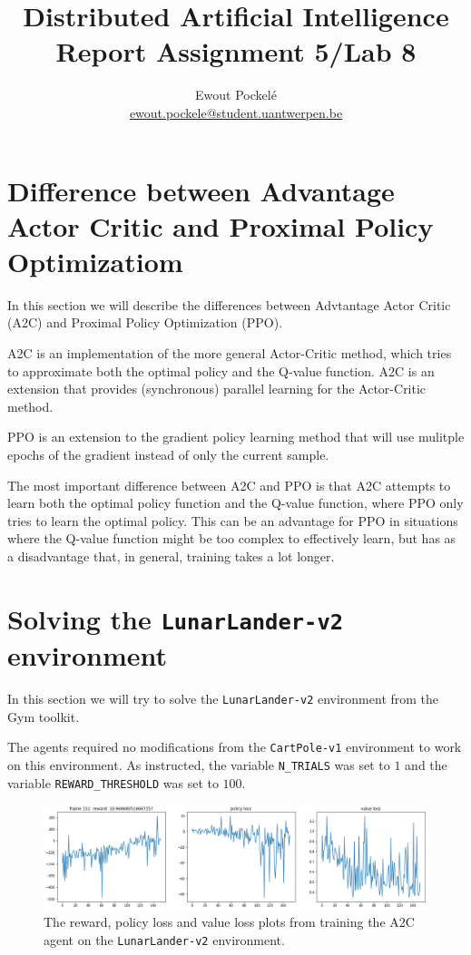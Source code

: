 \documentclass{article}
\title{Distributed Artificial Intelligence \\ \large{Report Assignment 5/Lab 8}}
\author{Ewout Pockelé \\ \href{mailto:ewout.pockele@student.uantwerpen.be}{ewout.pockele@student.uantwerpen.be}}
\begin{document}
 \maketitle

 \tableofcontents

 \section[Difference between A2C and PPO]{Difference between Advantage Actor 
   Critic and Proximal Policy Optimizatiom}
  In this section we will describe the differences between Advtantage Actor 
  Critic (A2C) and Proximal Policy Optimization (PPO).

  A2C is an implementation of the more general Actor-Critic method, which tries
  to approximate both the optimal policy and the Q-value function.  A2C is an
  extension that provides (synchronous) parallel learning for the Actor-Critic
  method. \cite[p.~62]{mets-policy-gradient}

  PPO is an extension to the gradient policy learning method that will use
  mulitple epochs of the gradient instead of only the current sample.
  \cite[p.~64]{mets-policy-gradient}

  The most important difference between A2C and PPO is that A2C attempts to
  learn both the optimal policy function and the Q-value function, where PPO
  only tries to learn the optimal policy.  This can be an advantage for PPO in
  situations where the Q-value function might be too complex to effectively
  learn, but has as a disadvantage that, in general, training takes a lot
  longer.

 \section{Solving the \texttt{LunarLander-v2} environment}
  In this section we will try to solve the \texttt{LunarLander-v2} environment
  from the Gym toolkit\cite{gym}.

  The agents required no modifications from the \texttt{CartPole-v1}
  environment to work on this environment.  As instructed, the variable
  \texttt{N\_TRIALS} was set to $1$ and the variable \texttt{REWARD\_THRESHOLD}
  was set to $100$.

  \begin{figure}[h]
   \centering
   \includegraphics[width=\textwidth, angle=90]{LunarLander-A2C-train}
   \caption{The reward, policy loss and value loss plots from training the A2C
            agent on the \texttt{LunarLander-v2} environment.}
   \label{ref:lunar-a2c-train}
  \end{figure}
\end{document}
